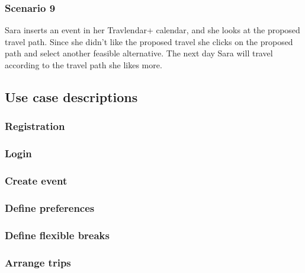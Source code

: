 	\subsubsection{Scenario 9}
		Sara inserts an event in her Travlendar+ calendar, and she looks at the proposed travel path. Since she didn’t like the proposed travel she clicks on the proposed path and select another feasible alternative. The next day Sara will travel according to the travel path she likes more.	
	
\subsection{Use case descriptions}
\label{subsect:Use case descriptions}

	\subsubsection{Registration}
		
		
	\subsubsection{Login}
		
		
	\subsubsection{Create event}
		
		
	\subsubsection{Define preferences}
		
		
	\subsubsection{Define flexible breaks}
			
		
	\subsubsection{Arrange trips}
			
		
